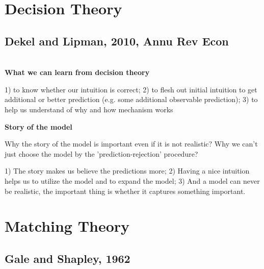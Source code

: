 \documentclass{book}
\theoremstyle{plain}
\theoremstyle{definition}
\begin{document}






\chapter{Decision Theory} %
\label{cha:decision_theory}

\section{Dekel and Lipman, 2010, Annu Rev Econ} %
\label{sec:dekel_and_lipman_2010_annu_rev_econ}

\textbf{}\\

\noindent
\textbf{What we can learn from decision theory}

1) to know whether our intuition is correct;
2) to flesh out initial intuition to get additional or better prediction (e.g. some additional observable prediction);
3) to help us understand of why and how mechanism works

\noindent
\textbf{Story of the model}

Why the story of the model is important even if it is not realistic? Why we can't just choose the model by the 'prediction-rejection' procedure?

1) The story makes us believe the predictions more;
2) Having a nice intuition helps us to utilize the model and to expand the model;
3) And a model can never be realistic, the important thing is whether it captures something important.




\chapter{Matching Theory} %
\label{cha:matching_theory}

\section{Gale and Shapley, 1962} %
\label{sec:gale_and_shapley_1962}

\textbf{}
\end{document}
